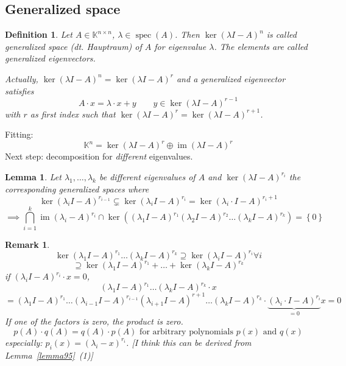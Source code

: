 \documentclass[a4paper]{article}
\newcounter{lecref}[section]
\numberwithin{lecref}{section}
\newtheorem{definition}[lecref]{Definition}
\newtheorem{lemma}[lecref]{Lemma}
\newtheorem*{Remark}{Remark}
\newcommand{\set}[1]{\left\{#1\right\}}
\DeclareMathOperator{\im}{im}
\begin{document}
\subsection{Generalized space}

\begin{definition} %
  Let $A \in \mathbb K^{n\times n}$, $\lambda \in \operatorname{spec}(A)$.
  Then $\ker(\lambda I - A)^n$ is called \emph{generalized space} (dt. \foreignlanguage{german}{Hauptraum})
  of $A$ for eigenvalue $\lambda$. The elements are called \emph{generalized eigenvectors}.

  Actually, $\ker(\lambda I - A)^n = \ker(\lambda I - A)^r$ and a generalized eigenvector satisfies
  \[ A \cdot x = \lambda \cdot x + y \qquad y \in \ker(\lambda I - A)^{r-1} \]
  with $r$ as first index such that $\ker(\lambda I - A)^r = \ker(\lambda I - A)^{r+1}$.
\end{definition}

Fitting:
\[ \mathbb K^n = \ker(\lambda I - A)^r \oplus \im(\lambda I - A)^r \]
Next step: decomposition for \emph{different} eigenvalues.

\begin{lemma} %
  \label{lemma1111}
  Let $\lambda_1, \dots, \lambda_k$ be different eigenvalues of $A$ and
  $\ker(\lambda I - A)^{r_i}$ the corresponding generalized spaces where
  \[ \ker(\lambda_i I - A)^{r_{i-1}} \subsetneq \ker(\lambda_i I - A)^{r_i} = \ker(\lambda_i \cdot I - A)^{r_i + 1} \]
  \[ \implies \bigcap_{i=1}^k \im(\lambda_i - A)^{r_i} \cap \ker((\lambda_1 I - A)^{r_1} (\lambda_2 I - A)^{r_2} \dots (\lambda_k I - A)^{r_k}) = \set{0} \]
\end{lemma}

\begin{Remark}
  \[ \ker(\lambda_1 I - A)^{r_1} \dots (\lambda_k I - A)^{r_k} \supseteq \ker(\lambda_i I - A)^{r_i} \forall i \]
  \[ \supseteq \ker(\lambda_1 I - A)^{r_1} + \dots + \ker(\lambda_k I - A)^{r_k} \]
  if $(\lambda_i I - A)^{r_i} \cdot x = 0$,
  \[ (\lambda_1 I - A)^{r_1} \dots (\lambda_k I - A)^{r_k} \cdot x \]
  \[ = (\lambda_1 I - A)^{r_1} \dots (\lambda_{i-1} I - A)^{r_{i-1}} (\lambda_{i+1} I - A)^{r+1} \dots (\lambda_k I - A)^{r_k} \cdot \underbrace{(\lambda_i \cdot I - A)^{r_i}}_{=0} x = 0 \]
  If one of the factors is zero, the product is zero.
  \[ p(A) \cdot q(A) = q(A) \cdot p(A) \text{ for arbitrary polynomials } p(x) \text{ and } q(x) \]
  especially: $p_i(x) = (\lambda_i - x)^{r_i}$. [I think this can be derived from Lemma~\ref{lemma95}~(1)]
\end{Remark}
\end{document}

